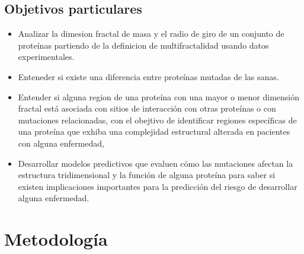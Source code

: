 \documentclass[11pt]{article}
\begin{document}
\subsection{Objetivos particulares}

\begin{itemize}

\item Analizar la dimesion fractal de masa y el radio de giro de un conjunto de proteínas partiendo de la definicion de multifractalidad usando datos experimentales.


\item Enteneder si existe una diferencia entre proteínas mutadas de las sanas.

\item Entender si alguna region de una proteína con una mayor o menor dimensión fractal está asociada con sitios de interacción con otras proteínas o con mutaciones relacionadas, con el obejtivo de identificar regiones específicas de una proteína que exhiba una complejidad estructural alterada en pacientes con  alguna enfermedad, 

\item Desarrollar modelos predictivos que evaluen cómo las mutaciones  afectan la estructura tridimensional y la función de alguna proteína  para saber si existen implicaciones importantes para la predicción del riesgo de desarrollar alguna enfermedad.

\end{itemize}

\clearpage

\section{Metodología}
\end{document}
